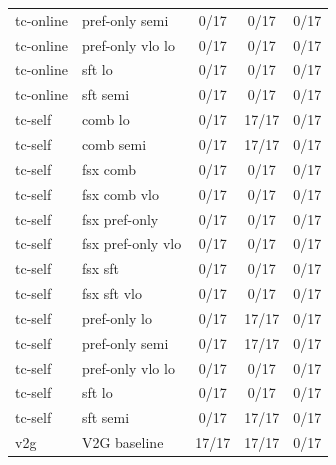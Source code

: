 \documentclass[10pt,landscape]{article}
\begin{document}
\begin{tabular}{llccc}
tc-online & pref-only semi & \cellcolor{missing}0/17 & \cellcolor{missing}0/17 & \cellcolor{missing}0/17 \\
tc-online & pref-only vlo lo & \cellcolor{missing}0/17 & \cellcolor{missing}0/17 & \cellcolor{missing}0/17 \\
tc-online & sft lo & \cellcolor{missing}0/17 & \cellcolor{missing}0/17 & \cellcolor{missing}0/17 \\
tc-online & sft semi & \cellcolor{missing}0/17 & \cellcolor{missing}0/17 & \cellcolor{missing}0/17 \\
tc-self & comb lo & \cellcolor{missing}0/17 & \cellcolor{done}17/17 & \cellcolor{missing}0/17 \\
tc-self & comb semi & \cellcolor{missing}0/17 & \cellcolor{done}17/17 & \cellcolor{missing}0/17 \\
tc-self & fsx comb & \cellcolor{missing}0/17 & \cellcolor{missing}0/17 & \cellcolor{missing}0/17 \\
tc-self & fsx comb vlo & \cellcolor{missing}0/17 & \cellcolor{missing}0/17 & \cellcolor{missing}0/17 \\
tc-self & fsx pref-only & \cellcolor{missing}0/17 & \cellcolor{missing}0/17 & \cellcolor{missing}0/17 \\
tc-self & fsx pref-only vlo & \cellcolor{missing}0/17 & \cellcolor{missing}0/17 & \cellcolor{missing}0/17 \\
tc-self & fsx sft & \cellcolor{missing}0/17 & \cellcolor{missing}0/17 & \cellcolor{missing}0/17 \\
tc-self & fsx sft vlo & \cellcolor{missing}0/17 & \cellcolor{missing}0/17 & \cellcolor{missing}0/17 \\
tc-self & pref-only lo & \cellcolor{missing}0/17 & \cellcolor{done}17/17 & \cellcolor{missing}0/17 \\
tc-self & pref-only semi & \cellcolor{missing}0/17 & \cellcolor{done}17/17 & \cellcolor{missing}0/17 \\
tc-self & pref-only vlo lo & \cellcolor{missing}0/17 & \cellcolor{missing}0/17 & \cellcolor{missing}0/17 \\
tc-self & sft lo & \cellcolor{missing}0/17 & \cellcolor{missing}0/17 & \cellcolor{missing}0/17 \\
tc-self & sft semi & \cellcolor{missing}0/17 & \cellcolor{done}17/17 & \cellcolor{missing}0/17 \\
v2g & V2G baseline & \cellcolor{done}17/17 & \cellcolor{done}17/17 & \cellcolor{missing}0/17 \\
\bottomrule
\end{tabular}
\vspace{1em}
\end{document}
